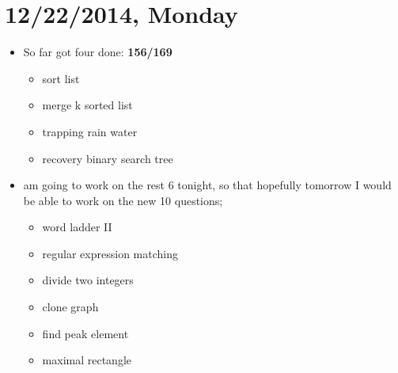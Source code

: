 \documentclass[9pt,b5paper]{article}
\begin{document}
\section{12/22/2014, Monday}
\label{sec-3}
\begin{itemize}
\item So far got four done: \textbf{156/169}
\begin{itemize}
\item sort list
\item merge k sorted list
\item trapping rain water
\item recovery binary search tree
\end{itemize}
\item am going to work on the rest 6 tonight, so that hopefully tomorrow I would be able to work on the new 10 questions;
\begin{itemize}
\item word ladder II
\item regular expression matching
\item divide two integers
\item clone graph
\item find peak element
\item maximal rectangle
\end{itemize}
\end{itemize}
\end{document}
